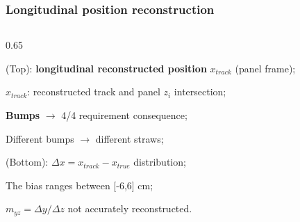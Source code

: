 \documentclass{beamer}
\begin{document}
\begin{frame}
    \frametitle{Longitudinal position reconstruction}

    \begin{columns}
\begin{column}{0.65\framewidth}
\vspace{-6mm}
   \setlength{\leftmargini}{1.2em}
      \begin{itemize}
 {\footnotesize
 \item (Top): \textbf{longitudinal reconstructed position} $x_{track}$ (panel frame);
 \vspace{5mm}
 \item $x_{track}$: reconstructed track and panel $z_i$ intersection;
 \vspace{5mm}
 \item  \textbf{Bumps} $\rightarrow$ 4/4 requirement consequence;
 \vspace{5mm}
\item Different bumps $\rightarrow$ different straws;
\vspace{5mm}
\item (Bottom): $\Delta x = x_{track}-x_{true}$ distribution;
  \vspace{5mm}
\item The bias ranges between [-6,6] cm;
  \vspace{5mm}
\item $m_{yz}=\Delta y/\Delta z$ not accurately reconstructed.}


\end{itemize}
\end{column}
\end{columns}
\end{frame}
\end{document}
